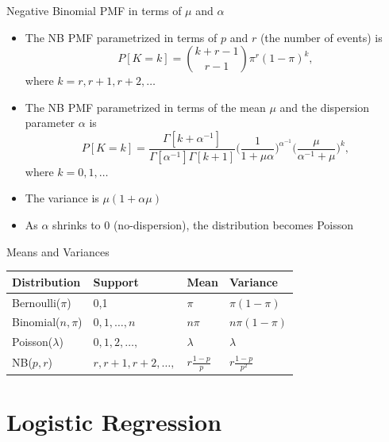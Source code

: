 \documentclass[xcolor=x11names,compress]{beamer}\usepackage[]{graphicx}\usepackage[]{color}
\begin{document}
\begin{frame}{Negative Binomial PMF in terms of $\mu$ and $\alpha$}
  \begin{itemize}
  \item The NB PMF parametrized in terms of $p$ and $r$ 
    (the number of events) is
    \begin{equation*} 
    P[K=k] = {k+r-1 \choose r-1} \pi^r (1-\pi)^{k},
    \end{equation*}
    where $k=r,r+1,r+2,\ldots$
  

  \item The NB PMF parametrized in terms of the mean $\mu$ and the dispersion
        parameter $\alpha$ is
        \begin{equation*}
           P[K=k]=\frac{\Gamma[k+\alpha^{-1}]}{\Gamma[\alpha^{-1}]\Gamma[k+1]}
             \bigg(\frac{1}{1+\mu\alpha}\bigg)^{\alpha^{-1}}
             \bigg(\frac{\mu}{\alpha^{-1}+\mu}\bigg)^k,
        \end{equation*}
     where $k=0,1,\ldots$
   \item The variance is $\mu ( 1+\alpha\mu)$
   \item As $\alpha$ shrinks to 0 (no-dispersion), the distribution becomes Poisson 
  \end{itemize}
\end{frame}

\begin{frame}{Means and Variances}
  \begin{table}
    \centering
    \begin{tabular}{|l|l|l|l|}\hline
      Distribution&Support&Mean&Variance\\\hline\hline
      Bernoulli($\pi$)&0,1&$\pi$&$\pi(1-\pi)$\\\hline
      Binomial($n,\pi$)&$0,1,\ldots,n$&$n\pi$&$n\pi(1-\pi)$\\\hline
      Poisson($\lambda$)&$0,1,2,\ldots,$&$\lambda$&$\lambda$\\\hline
      NB($p,r$)&$r,r+1,r+2,\ldots,$&$r\frac{1-p}{p}$&$r\frac{1-p}{p^2}$\\\hline\hline
    \end{tabular}
  \end{table}
\end{frame}


\section[GLM]{Logistic Regression}
\end{document}

